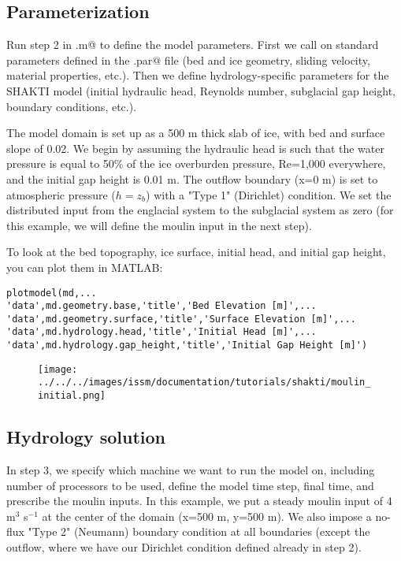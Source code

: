 \subsection{Parameterization}
Run step 2 in \verb@runme.m@ to define the model parameters. First we call on standard parameters defined in the \verb@moulin.par@ file (bed and ice geometry, sliding velocity, material properties, etc.). Then we define hydrology-specific parameters for the SHAKTI model (initial hydraulic head, Reynolds number, subglacial gap height, boundary conditions, etc.).

The model domain is set up as a 500 m thick slab of ice, with bed and surface slope of 0.02. We begin by assuming the hydraulic head is such that the water pressure is equal to 50\% of the ice overburden pressure, Re=1,000 everywhere, and the initial gap height is 0.01 m. The outflow boundary (x=0 m) is set to atmospheric pressure ($h=z_b$) with a "Type 1" (Dirichlet) condition. We set the distributed input from the englacial system to the subglacial system as zero (for this example, we will define the moulin input in the next step).

To look at the bed topography, ice surface, initial head, and initial gap height, you can plot them in MATLAB:

\begin{verbatim}plotmodel(md,...
'data',md.geometry.base,'title','Bed Elevation [m]',...
'data',md.geometry.surface,'title','Surface Elevation [m]',...
'data',md.hydrology.head,'title','Initial Head [m]',...
'data',md.hydrology.gap_height,'title','Initial Gap Height [m]')\end{verbatim}

\begin{figure}[H]
	\begin{center}
		\texttt{[image: ../../../images/issm/documentation/tutorials/shakti/moulin\_initial.png]}
	\end{center}
\end{figure}

\subsection{Hydrology solution}
In step 3, we specify which machine we want to run the model on, including number of processors to be used, define the model time step, final time, and prescribe the moulin inputs. In this example, we put a steady moulin input of 4 m$^3$ s$^{-1}$ at the center of the domain (x=500 m, y=500 m). We also impose a no-flux "Type 2" (Neumann) boundary condition at all boundaries (except the outflow, where we have our Dirichlet condition defined already in step 2).

